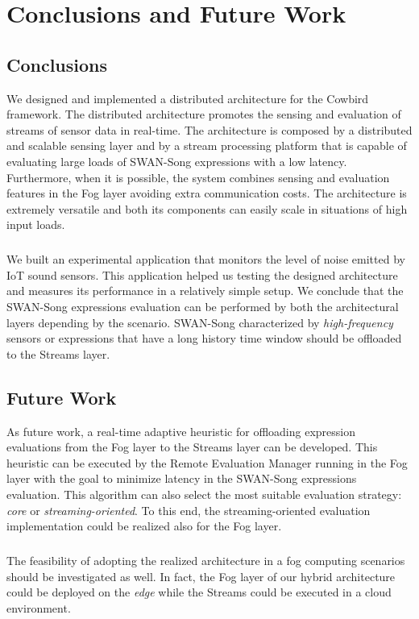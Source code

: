 \chapter{Conclusions and Future Work}
\section{Conclusions}
We designed and implemented a distributed architecture for the Cowbird framework. The distributed architecture promotes the sensing and evaluation of streams of sensor data in real-time. The architecture is composed by a distributed and scalable sensing layer and by a stream processing platform that is capable of evaluating large loads of SWAN-Song expressions with a low latency. Furthermore, when it is possible, the system combines sensing and evaluation features in the Fog layer avoiding extra communication costs. The architecture is extremely versatile and both its components can easily scale in situations of high input loads.
\paragraph{}
We built an experimental application that monitors the level of noise emitted by IoT sound sensors. This application helped us testing the designed architecture and measures its performance in a relatively simple setup. We conclude that the SWAN-Song expressions evaluation can be performed by both the architectural layers depending by the scenario. SWAN-Song characterized by \emph{high-frequency} sensors or expressions that have a long history time window should be offloaded to the Streams layer. 

\section{Future Work}
As future work, a real-time adaptive heuristic for offloading expression evaluations from the Fog layer to the Streams layer can be developed. This heuristic can be executed by the Remote Evaluation Manager running in the Fog layer with the goal to minimize latency in the SWAN-Song expressions evaluation. This algorithm can also select the most suitable evaluation strategy: \emph{core} or \emph{streaming-oriented}. To this end, the streaming-oriented evaluation implementation could be realized also for the Fog layer.
\paragraph{}
The feasibility of adopting the realized architecture in a fog computing scenarios should be investigated as well. In fact, the Fog layer of our hybrid architecture could be deployed on the \emph{edge} while the Streams could be executed in a cloud environment.
